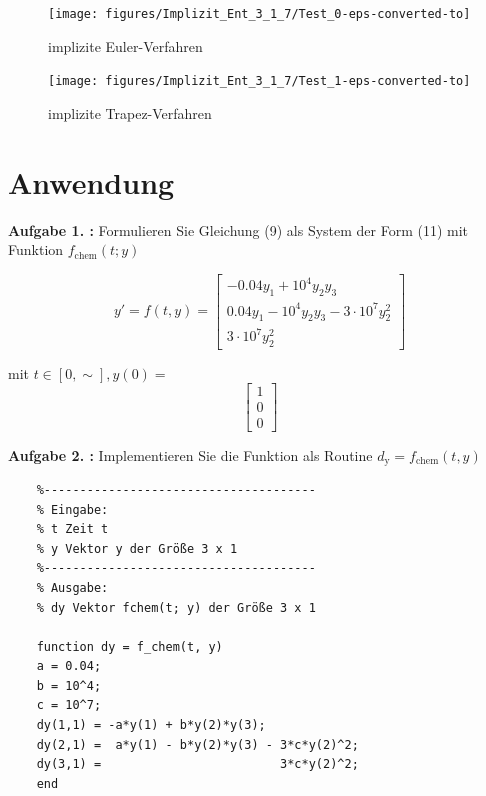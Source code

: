 \begin{figure}[h]
	\centering
	\texttt{[image: figures/Implizit\_Ent\_3\_1\_7/Test\_0-eps-converted-to]}
	\caption{implizite Euler-Verfahren}
\end{figure}

\begin{figure}[h]
	\centering
	\texttt{[image: figures/Implizit\_Ent\_3\_1\_7/Test\_1-eps-converted-to]}
	\caption{implizite Trapez-Verfahren}
\end{figure}


\clearpage

\section{Anwendung}
\begin{mybox}
	\textbf{Aufgabe 1. :} Formulieren Sie Gleichung (9) als System der Form (11) mit Funktion $f_{\mathrm{chem}}(t; y)$
\end{mybox}



\begin{equation}
	y' = f(t,y) = 
\begin{bmatrix}
	-0.04y_1 + 10^4y_2y_3 \\
	0.04y_1-10^4y_2y_3-3\cdot 10^7y^2_2 \\
	3 \cdot 10^7y^2_2 
\end{bmatrix}  
\end{equation}


mit $ t\in [0,\sim], y(0) = $ 
\begin{equation}
\begin{bmatrix}
	1 \\
	0 \\
	0
\end{bmatrix}
\end{equation}
\begin{mybox}
	\textbf{Aufgabe 2. :}  Implementieren Sie die Funktion als Routine $ d_\mathrm{y} = f_{\mathrm{chem}}(t,y) $
\end{mybox}



\begin{lstlisting}[style=Matlab-editor]
	% dy=f_chem(t,y)
	%--------------------------------------
	% Eingabe:
	% t Zeit t
	% y Vektor y der Größe 3 x 1
	%--------------------------------------
	% Ausgabe:
	% dy Vektor fchem(t; y) der Größe 3 x 1

	function dy = f_chem(t, y)
	a = 0.04;
	b = 10^4;
	c = 10^7;
	dy(1,1) = -a*y(1) + b*y(2)*y(3);
	dy(2,1) =  a*y(1) - b*y(2)*y(3) - 3*c*y(2)^2;
	dy(3,1) =                         3*c*y(2)^2;
	end
\end{lstlisting}


